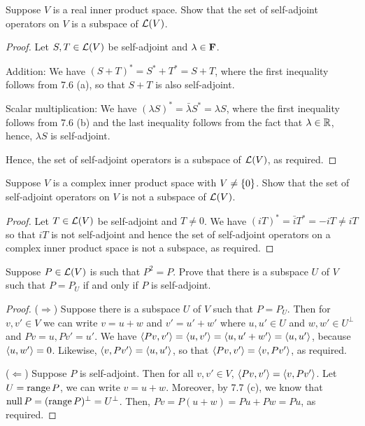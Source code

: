 \begin{exercise}{8}
  Suppose $V$ is a real inner product space. Show that the set of self-adjoint operators on $V$ is a subspace of $\mathcal{L}(V)$.
\end{exercise}
\begin{proof}
 Let $S,T\in\mathcal{L}(V)$ be self-adjoint and $\lambda\in\mathbf{F}$.

 Addition: We have $(S+T)^\ast =S^\ast+T^\ast =S+T$, where the first inequality follows from 7.6 (a), so that $S+T$ is also self-adjoint.

 Scalar multiplication: We have $(\lambda S)^\ast =\bar{\lambda}S^\ast =\lambda S$, where the first inequality follows from 7.6 (b) and the last inequality follows from the fact that $\lambda\in\mathbb{R}$, hence, $\lambda S$ is self-adjoint.

 Hence, the set of self-adjoint operators is a subspace of $\mathcal{L}(V)$, as required.
\end{proof}

\begin{exercise}{9}
  Suppose $V$ is a complex inner product space with $V\neq\{0\}$. Show that the set of self-adjoint operators on $V$ is not a subspace of $\mathcal{L}(V)$.
\end{exercise}
\begin{proof}
 Let $T\in\mathcal{L}(V)$ be self-adjoint and $T\neq 0$. We have $(i T)^\ast =\bar{i}T^\ast =-iT\neq iT$ so that $iT$ is not self-adjoint and hence the set of self-adjoint operators on a complex inner product space is not a subspace, as required.
\end{proof}

\begin{exercise}{11}
  Suppose $P\in\mathcal{L}(V)$ is such that $P^2=P$. Prove that there is a subspace $U$ of $V$ such that $P=P_U$ if and only if $P$ is self-adjoint.
\end{exercise}
\begin{proof}
 ($\Rightarrow$) Suppose there is a subspace $U$ of $V$ such that $P=P_U$. Then for $v,v'\in V$ we can write $v=u+w$ and $v'=u'+w'$ where $u,u'\in U$ and $w,w'\in U^\perp$ and $Pv=u, Pv'=u'$. We have $\langle Pv,v'\rangle =\langle u, v'\rangle =\langle u, u'+w'\rangle =\langle u,u'\rangle$, because $\langle u,w'\rangle=0$. Likewise, $\langle v,P v'\rangle =\langle u,u'\rangle$, so that $\langle Pv,v'\rangle=\langle v,Pv'\rangle$, as required.

 ($\Leftarrow$) Suppose $P$ is self-adjoint. Then for all $v,v'\in V$, $\langle Pv,v'\rangle =\langle v,Pv'\rangle$. Let $U=\operatorname*{range} P$, we can write $v=u+w$. Moreover, by 7.7 (c), we know that $\operatorname*{null} P =(\operatorname*{range} P)^\perp =U^\perp$. Then, $Pv =P(u+w) =Pu +Pw =Pu$, as required.
\end{proof}

